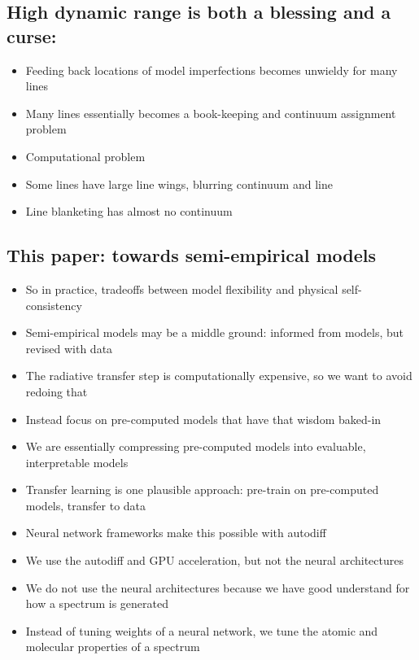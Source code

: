 \documentclass[modern]{aastex631}
\begin{document}
\subsection{High dynamic range is both a blessing and a curse:}
\begin{itemize}
  \item Feeding back locations of model imperfections becomes unwieldy for many lines
  \item Many lines essentially becomes a book-keeping and continuum assignment problem
  \item Computational problem
  \item Some lines have large line wings, blurring continuum and line
  \item Line blanketing has almost no continuum
\end{itemize}

\subsection{This paper: towards semi-empirical models}
\begin{itemize}
  \item So in practice, tradeoffs between model flexibility and physical self-consistency
  \item Semi-empirical models may be a middle ground: informed from models, but revised with data
  \item The radiative transfer step is computationally expensive, so we want to avoid redoing that
  \item Instead focus on pre-computed models that have that wisdom baked-in
  \item We are essentially compressing pre-computed models into evaluable, interpretable models
  \item Transfer learning is one plausible approach: pre-train on pre-computed models, transfer to data
  \item Neural network frameworks make this possible with autodiff
  \item We use the autodiff and GPU acceleration, but not the neural architectures
  \item We do not use the neural architectures because we have good understand for how a spectrum is generated
  \item Instead of tuning weights of a neural network, we tune the atomic and molecular properties of a spectrum
\end{itemize}
\end{document}
